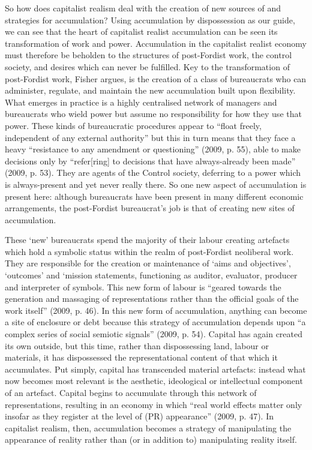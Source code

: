 So how does capitalist realism deal with the creation of new sources of
and strategies for accumulation? Using accumulation by dispossession as
our guide, we can see that the heart of capitalist realist accumulation
can be seen its transformation of work and power. Accumulation in the
capitalist realist economy must therefore be beholden to the structures
of post-Fordist work, the control society, and desires which can never
be fulfilled. Key to the transformation of post-Fordist work, Fisher
argues, is the creation of a class of bureaucrats who can administer,
regulate, and maintain the new accumulation built upon flexibility. What
emerges in practice is a highly centralised network of managers and
bureaucrats who wield power but assume no responsibility for how they
use that power. These kinds of bureaucratic procedures appear to ``float
freely, independent of any external authority'' but this in turn means
that they face a heavy ``resistance to any amendment or questioning''
(2009, p. 55), able to make decisions only by ``refer{[}ring{]} to
decisions that have always-already been made'' (2009, p. 53). They are
agents of the Control society, deferring to a power which is
always-present and yet never really there. So one new aspect of
accumulation is present here: although bureaucrats have been present in
many different economic arrangements, the post-Fordist bureaucrat's job
is that of creating new sites of accumulation.

These `new' bureaucrats spend the majority of their labour creating
artefacts which hold a symbolic status within the realm of post-Fordist
neoliberal work. They are responsible for the creation or maintenance of
`aims and objectives', `outcomes' and `mission statements, functioning
as auditor, evaluator, producer and interpreter of symbols. This new
form of labour is ``geared towards the generation and massaging of
representations rather than the official goals of the work itself''
(2009, p. 46). In this new form of accumulation, anything can become a
site of enclosure or debt because this strategy of accumulation depends
upon ``a complex series of social semiotic signals'' (2009, p. 54).
Capital has again created its own outside, but this time, rather than
dispossessing land, labour or materials, it has dispossessed the
representational content of that which it accumulates. Put simply,
capital has transcended material artefacts: instead what now becomes
most relevant is the aesthetic, ideological or intellectual component of
an artefact. Capital begins to accumulate through this network of
representations, resulting in an economy in which ``real world effects
matter only insofar as they register at the level of (PR) appearance''
(2009, p. 47). In capitalist realism, then, accumulation becomes a
strategy of manipulating the appearance of reality rather than (or in
addition to) manipulating reality itself.  

